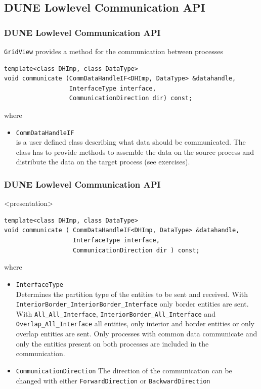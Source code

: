 \documentclass[aspectratio=169,11pt]{beamer}
\theoremstyle{definition}
\begin{document}
\subsection{DUNE Lowlevel Communication API}
\begin{frame}[fragile]
  \frametitle<presentation>{DUNE Lowlevel Communication API}

  \texttt{GridView} provides a method for the communication between processes
    \begin{lstlisting}
template<class DHImp, class DataType>
void communicate (CommDataHandleIF<DHImp, DataType> &datahandle,
                  InterfaceType interface,
                  CommunicationDirection dir) const;
    \end{lstlisting}
where
    \begin{itemize}
    \item \lstinline!CommDataHandleIF!\\
      is a user defined class describing what data should be communicated. The class has to provide methods to assemble the data on the
      source process and distribute the data on the target process (see exercises).
    \end{itemize}
\end{frame}


\begin{frame}[fragile]
  \frametitle<presentation>{DUNE Lowlevel Communication API}
  \begin{onlyenv}<presentation>
    \begin{lstlisting}
template<class DHImp, class DataType>
void communicate ( CommDataHandleIF<DHImp, DataType> &datahandle,
                   InterfaceType interface,
                   CommunicationDirection dir ) const;
    \end{lstlisting}
\lstset{basicstyle=\normalsize\ttfamily}
where
    \end{onlyenv}
    \begin{itemize}
    \item \lstinline!InterfaceType!\\
    Determines the partition type of the entities to be sent and received. With \lstinline!InteriorBorder_InteriorBorder_Interface! only
border entities are sent. With \lstinline!All_All_Interface!,
    \lstinline!InteriorBorder_All_Interface! and
    \lstinline!Overlap_All_Interface! all entities, only interior and border entities or only overlap entities are sent. Only processes with common
data communicate and only the entities present on both processes are included in the communication.
    \item \lstinline!CommunicationDirection!
      The direction of the communication can be changed with either \lstinline!ForwardDirection! or
      \lstinline!BackwardDirection!
    \end{itemize}
\end{frame}
\end{document}
